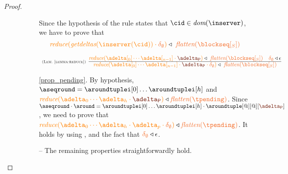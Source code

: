 \begin{proof}
\begin{itemize}
\begin{itemize}
\begin{itemize}
							Since the hypothesis of the rule states that $\cid\in\dom\inserver$, we have to prove that
							\[\ireduce{\igetdeltas{\inserver(\cid)}\cdot \emptydelta} \triangleleft \ \flatten{\tsent} \]
				
							\[
						  	\mathrulean{\lemref{lemma:reduce}}
						  	{\ireduce{\adelta[_0] \cdots \adelta[_{n-1}]\cdot\pushbuffer} \triangleleft \ \flatten{\tsent}
								\quad
								\emptydelta \triangleleft \epsilon}
  							{\ireduce{\adelta[_0] \cdots \adelta[_{n-1}]\cdot\pushbuffer\cdot\emptydelta} \triangleleft \ \flatten{\tsent}}  
							\]
							
							
			
							\item[\ref{prop_pending}.] By hypothesis, $\pending = \aroundtuplei[0]\ldots\aroundtuplei[h]$ and  
							$\ireduce{\adelta_0\cdots\adelta_h\cdot\pushbuffer} \triangleleft \flatten{\tpending}$.
							 Since $\pending \cdot \around = \aroundtuplei[0]\ldots\aroundtuplei[h]\cdot{\aroundtuple[@][@][\pushbuffer]}$,
							we need to prove that  $\ireduce{\adelta_0\cdots\adelta_h\cdot\adelta_p\cdot\emptydelta} \triangleleft \flatten{\tpending}$. 
							It holds by using , and the fact that $\emptydelta \triangleleft \epsilon$.
						\item[{--}] The remaining properties straightforwardly hold.
							
						\end{itemize}



\end{itemize}
\end{itemize}
\end{proof}
